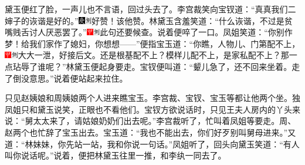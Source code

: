 黛玉便红了脸，一声儿也不言语，回过头去了。李宫裁笑向宝钗道：“真真我们二婶子的诙谐是好的。”{\includegraphics[width=3mm]{../Images/00004}\includegraphics[width=3mm]{../Images/00011}\footnotesize \kaishu 好赞！该他赞。}林黛玉含羞笑道：“什么诙谐，不过是贫嘴贱舌讨人厌恶罢了。”{\includegraphics[width=3mm]{../Images/00002}\includegraphics[width=3mm]{../Images/00011}\footnotesize \kaishu 此句还要候查。}说着便啐了一口。凤姐笑道：“你别作梦！给我们家作了媳妇，你想想------”便指宝玉道：“你瞧，人物儿、门第配不上，{\includegraphics[width=3mm]{../Images/00002}\includegraphics[width=3mm]{../Images/00011}\footnotesize \kaishu 大大一泄，好接后文。}还是根基配不上？模样儿配不上，是家私配不上？那一点玷辱了谁呢？”林黛玉便起身要走。宝钗便叫道：“颦儿急了，还不回来坐着。走了倒没意思。”说着便站起来拉住。

只见赵姨娘和周姨娘两个人进来瞧宝玉。李宫裁、宝钗、宝玉等都让他两个坐。独凤姐只和黛玉说笑，正眼也不看他们。宝钗方欲说话时，只见王夫人房内的丫头来说：“舅太太来了，请姑娘奶奶们出去呢。”李宫裁听了，忙叫着凤姐等要走。周、赵两个也忙辞了宝玉出去。宝玉道：“我也不能出去，你们好歹别叫舅母进来。”又道：“林妹妹，你先站一站，我和你说一句话。”凤姐听了，回头向黛玉笑道：“有人叫你说话呢。”说着，便把林黛玉往里一推，和李纨一同去了。

